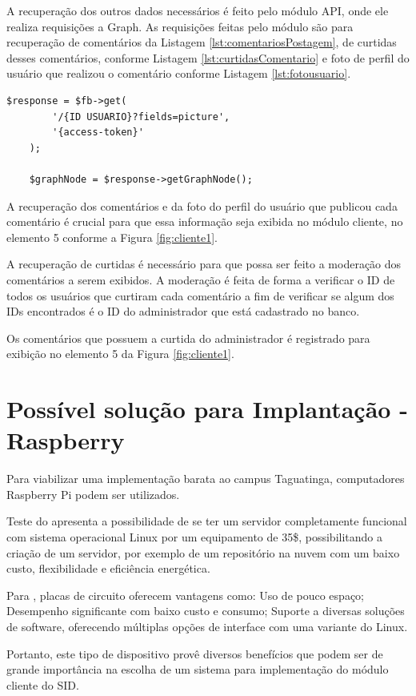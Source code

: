 A recuperação dos outros dados necessários é feito pelo módulo API, onde ele realiza requisições a Graph. As requisições feitas pelo módulo são para recuperação de comentários da Listagem \ref{lst:comentariosPostagem}, de curtidas desses comentários, conforme Listagem \ref{lst:curtidasComentario} e foto de perfil do usuário que realizou o comentário conforme Listagem \ref{lst:fotousuario}.

\begin{lstlisting}[caption={Foto de usuário},label={lst:fotousuario}]
  	$response = $fb->get(
    	'/{ID USUARIO}?fields=picture',
		'{access-token}'
	);
	
	$graphNode = $response->getGraphNode();
\end{lstlisting}

A recuperação dos comentários e da foto do perfil do usuário que publicou cada comentário é crucial para que essa informação seja exibida no módulo cliente, no elemento 5 conforme a Figura \ref{fig:cliente1}.

A recuperação de curtidas é necessário para que possa ser feito a moderação dos comentários a serem exibidos. A moderação é feita de forma a verificar o ID de todos os usuários que curtiram cada comentário a fim de verificar se algum dos IDs encontrados é o ID do administrador que está cadastrado no banco.

Os comentários que possuem a curtida do administrador é registrado para exibição no elemento 5 da Figura \ref{fig:cliente1}.

\section{Possível solução para Implantação - Raspberry}
Para viabilizar uma implementação barata ao campus Taguatinga, computadores Raspberry Pi podem ser utilizados.

Teste do \cite{aristotelous2016} apresenta a possibilidade de se ter um servidor completamente funcional com sistema operacional Linux por um equipamento de 35\$, possibilitando a criação de um servidor, por exemplo de um repositório na nuvem com um baixo custo, flexibilidade e eficiência energética. 

Para \cite{cusick2014}, placas de circuito oferecem vantagens como: Uso de pouco espaço; Desempenho significante com baixo custo e consumo; Suporte a diversas soluções de software, oferecendo múltiplas opções de interface com uma variante do Linux. 

Portanto, este tipo de dispositivo provê diversos benefícios que podem ser de grande importância na escolha de um sistema para implementação do módulo cliente do SID.